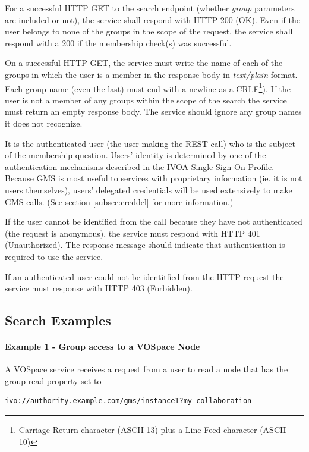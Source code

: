 \documentclass[11pt,a4paper]{ivoa}
\begin{document}
For a successful HTTP GET to the search endpoint (whether \emph{group} parameters are included or not), the service shall respond with HTTP 200 (OK).  Even if the user belongs to none of the groups in the scope of the request, the service shall respond with a 200 if the membership check(s) was successful.

On a successful HTTP GET, the service must write the name of each of the groups in which the user is a member in the response body in \emph{text/plain} format.  Each group name (even the last) must end with a newline as a CRLF\footnote{Carriage Return character (ASCII 13) plus a Line Feed character (ASCII 10)}).  If the user is not a member of any groups within the scope of the search the service must return an empty response body.  The service should ignore any group names it does not recognize.

It is the authenticated user (the user making the REST call) who is the subject of the membership question.  Users' identity is determined by one of the authentication mechanisms described in the IVOA Single-Sign-On Profile.  Because GMS is most useful to services with proprietary information (ie. it is not users themselves), users' delegated credentials will be used extensively to make GMS calls.  (See section \ref{subsec:creddel} for more information.)

If the user cannot be identified from the call because they have not authenticated (the request is anonymous), the service must respond with HTTP 401 (Unauthorized).  The response message should indicate that authentication is required to use the service.

If an authenticated user could not be identitfied from the HTTP request the service must response with HTTP 403 (Forbidden).

\subsection {Search Examples}
\label{subsec:examples}

\paragraph{Example 1 - Group access to a VOSpace Node}

A VOSpace service receives a request from a user to read a node that has the group-read property set to

\begin{verbatim}
ivo://authority.example.com/gms/instance1?my-collaboration
\end{verbatim}
\end{document}
